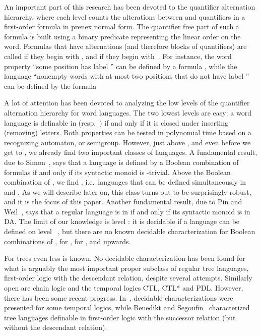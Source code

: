 \documentclass{LMCS}
\begin{document}
An important part of this research has been devoted to the quantifier
alternation hierarchy, where each level counts the alterations between
 and  quantifiers in a first-order formula in prenex normal
form. The quantifier free part of such a formula is  built using a binary
predicate  representing the linear order on the word. Formulas that have
 alternations (and therefore  blocks of quantifiers) are called  if they begin with , and
 if they begin with~. For instance, the word property ``some
position has label '' can be defined by a  formula , while the language ``nonempty words with at most two positions that
do not have label '' can be defined by the  formula



A lot of attention has been devoted to analyzing the low levels of the
quantifier alternation hierarchy for word languages.  The two lowest levels are easy: a word
language is definable in  (resp.~) if and only if it is
closed under inserting (removing) letters. Both properties can be tested in
polynomial time based on a recognizing automaton, or semigroup.  However, just
above , and even before we get to , we already find two important classes of languages.  A fundamental
result, due to Simon~\cite{simonpiecewise}, says that a language is defined by
a Boolean combination of  formulas if and only if its syntactic
monoid is -trivial. Above the Boolean combination of ,
we find , i.e.~languages that can be defined simultaneously in
 and . As we will describe later on, this class turns
out to be surprisingly robust, and it is the focus of this paper. Another
fundamental result, due to Pin and Weil~\cite{weilpinpoly}, says that a regular
language is in  if and only if its syntactic monoid is in {\sc
  DA}.  The limit of our knowledge is level : it is decidable if a
language can be defined on level ~\cite{arfi91,weilpinpoly}, but
there are no known decidable characterization for Boolean combinations of
, for , for , and upwards.


For trees even less is known.  No decidable characterization has been
found for what is arguably the most important proper subclass of
regular tree languages, first-order logic with the descendant
relation, despite several attempts.  Similarly open are chain logic
and the temporal logics CTL, CTL* and PDL.  However, there has been
some recent progress.  In~\cite{efextcs}, decidable characterizations
were presented for some temporal logics, while Benedikt and
Segoufin~\cite{segoufinfo} characterized tree languages definable in
first-order logic with the successor relation (but without the
descendant relation).
\end{document}

